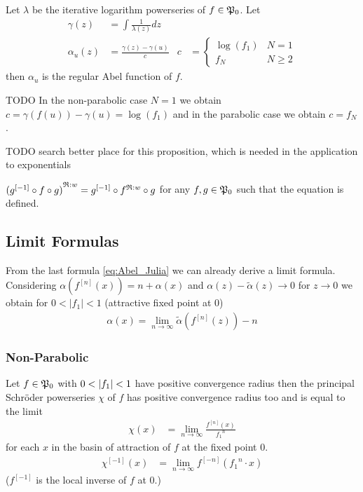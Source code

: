\documentclass{article}
\numberwithin{equation}{section}
\begin{document}
\begin{proposition}
  Let $\lambda$ be the iterative logarithm powerseries of
  $f\in\mathfrak{P}_0$. Let 
  \begin{align*}
    \gamma(z)&=\int \frac{1}{\lambda(z)} dz\\
    \alpha_u(z)&=\frac{\gamma(z)-\gamma(u)}{c} &
    c&=\begin{cases}\log(f_1)& N=1\\f_N & N\ge 2\end{cases}
  \end{align*}
  then $\alpha_u$ is the regular Abel function of $f$.
\end{proposition}

TODO
In the non-parabolic case $N=1$ we obtain
$c={\gamma(f(u))-\gamma(u)}={\log(f_1)}$ and in the
parabolic case we obtain $c=f_N$.


TODO search better place for this proposition, which is needed in the
application to exponentials
\begin{proposition}\label{prop:regular_conjugate_iterate}
  ${(g^{[-1]}\circ f\circ g)}^{\mathfrak{R}:w}=g^{[-1]}\circ {f}^{\mathfrak{R}:w} \circ
  g$ for any $f,g\in\mathfrak{P}_0$ such that the equation is defined.
\end{proposition}

\subsection{Limit Formulas}

From the last formula \eqref{eq:Abel_Julia} we can already derive a
limit formula. Considering $\alpha(f^{[n]}(x))=n+\alpha(x)$ and
$\alpha(z)-\tilde{\alpha}(z)\to 0$ for $z\to 0$ we obtain for
$0<|f_1|<1$ (attractive fixed point at 0)
\begin{align}\label{eq:Ecalle}
  \alpha(x)=\lim_{n\to\infty} \tilde{\alpha}(f^{[n]}(z)) - n
\end{align}

\subsubsection{Non-Parabolic}
\label{sec:Non-parabolic limit}
\begin{proposition}
  Let $f\in \mathfrak{P}_0$ with $0<\left|f_1\right|<1$ have positive convergence radius
  then the principal Schr\"oder powerseries $\chi$ of $f$ has positive
  convergence radius too and is equal to the limit
  \begin{align*}
    \chi(x) &= \lim_{n\to\infty} \frac{f^{[n]}(x)}{{f_1}^n} 
  \end{align*}
  for each $x$ in the basin of attraction of $f$ at the fixed point 0.
  \begin{align*}
    \chi^{[-1]}(x) &= \lim_{n\to\infty} f^{[-n]}\left({f_1}^n\cdot
      x\right) 
  \end{align*}
  ($f^{[-1]}$ is the local inverse of $f$ at 0.)
\end{proposition}
\end{document}
